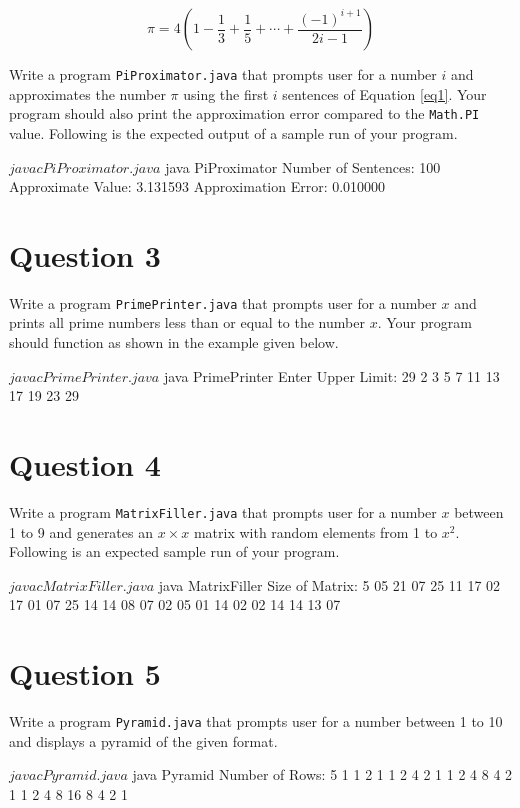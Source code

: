 \begin{equation}
\pi = 4 \left( 1 - \frac{1}{3} + \frac{1}{5} + \cdots + \frac{(-1)^{i+1}}{2i-1} \right)
\label{eq1}
\end{equation}

Write a program \texttt{PiProximator.java} that prompts user for a number $i$ and approximates the number $\pi$ using the first $i$ sentences of Equation \ref{eq1}.
Your program should also print the approximation error compared to the \texttt{Math.PI} value.
Following is the expected output of a sample run of your program.

\newpage

\begin{terminal}
$ javac PiProximator.java
$ java PiProximator
Number of Sentences: 100
Approximate Value: 3.131593
Approximation Error: 0.010000
\end{terminal}

\section*{Question 3}
Write a program \texttt{PrimePrinter.java} that prompts user for a number $x$ and prints all prime numbers less than or equal to the number $x$.
Your program should function as shown in the example given below.

\begin{terminal}
$ javac PrimePrinter.java
$ java PrimePrinter
Enter Upper Limit: 29
2 3 5 7 11 13 17 19 23 29
\end{terminal}

\section*{Question 4}
Write a program \texttt{MatrixFiller.java} that prompts user for a number $x$ between 1 to 9 and generates an $x \times x$ matrix with random elements from 1 to $x^2$.
Following is an expected sample run of your program.

\begin{terminal}
$ javac MatrixFiller.java
$ java MatrixFiller
Size of Matrix: 5
 05 21 07 25 11
 17 02 17 01 07
 25 14 14 08 07
 02 05 01 14 02
 02 14 14 13 07
\end{terminal}

\newpage

\section*{Question 5}
Write a program \texttt{Pyramid.java} that prompts user for a number between 1 to 10 and displays a pyramid of the given format.

\begin{terminal}
$ javac Pyramid.java
$ java Pyramid
Number of Rows: 5
                   1
               1   2   1
           1   2   4   2   1
       1   2   4   8   4   2   1
   1   2   4   8  16   8   4   2   1
\end{terminal}
